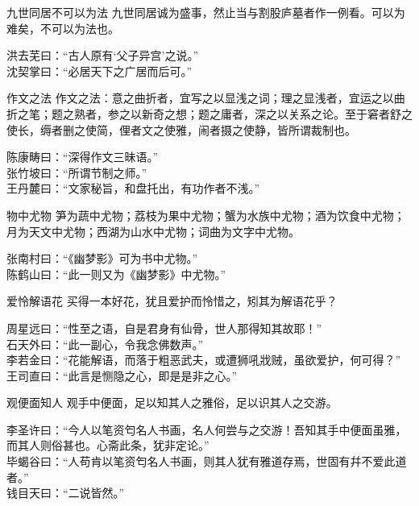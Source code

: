 \begin{yulu}{九世同居不可以为法}
九世同居诚为盛事，然止当与割股庐墓者作一例看。可以为难矣，不可以为法也。
\begin{comments}
洪去芜曰：“古人原有‘父子异宫’之说。” \\
沈契掌曰：“必居天下之广居而后可。”
\end{comments}
\end{yulu}

\begin{yulu}{作文之法}
作文之法：意之曲折者，宜写之以显浅之词；理之显浅者，宜运之以曲折之笔；题之熟者，参之以新奇之想；题之庸者，深之以关系之论。至于窘者舒之使长，缛者删之使简，俚者文之使雅，闹者摄之使静，皆所谓裁制也。
\begin{comments}
陈康畴曰：“深得作文三昧语。” \\
张竹坡曰：“所谓节制之师。” \\
王丹麓曰：“文家秘旨，和盘托出，有功作者不浅。”
\end{comments}
\end{yulu}

\begin{yulu}{物中尤物}
笋为蔬中尤物；荔枝为果中尤物；蟹为水族中尤物；酒为饮食中尤物；月为天文中尤物；西湖为山水中尤物；词曲为文字中尤物。
\begin{comments}
张南村曰：“《幽梦影》可为书中尤物。” \\
陈鹤山曰：“此一则又为《幽梦影》中尤物。”
\end{comments}
\end{yulu}

\begin{yulu}{爱怜解语花}
买得一本好花，犹且爱护而怜惜之，矧其为解语花乎？
\begin{comments}
周星远曰：“性至之语，自是君身有仙骨，世人那得知其故耶！” \\
石天外曰：“此一副心，令我念佛数声。” \\
李若金曰：“花能解语，而落于粗恶武夫，或遭狮吼戕贼，虽欲爱护，何可得？” \\
王司直曰：“此言是恻隐之心，即是是非之心。”
\end{comments}
\end{yulu}

\begin{yulu}{观便面知人}
观手中便面，足以知其人之雅俗，足以识其人之交游。
\begin{comments}
李圣许曰：“今人以笔资匄名人书画，名人何尝与之交游！吾知其手中便面虽雅，而其人则俗甚也。心斋此条，犹非定论。” \\
毕蝎谷曰：“人苟肯以笔资匄名人书画，则其人犹有雅道存焉，世固有幷不爱此道者。” \\
钱目天曰：“二说皆然。”
\end{comments}
\end{yulu}

